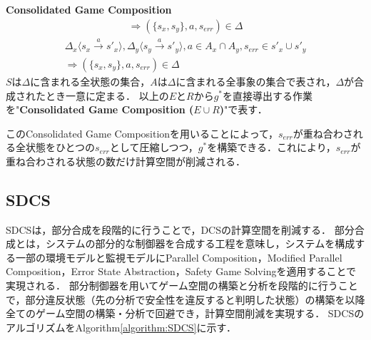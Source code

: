 \begin{dfn}{\textbf{Consolidated Game Composition}}
\begin{multline}
    \Rightarrow (\{ s_{x},s_{y} \},a,s_{err}) \in \Delta
    \end{multline}
    \begin{multline}
    \label{formula:pc6}
    \Delta_x \langle s_{x} \overset{a}{\rightarrow} s'_{x} \rangle, \Delta_y \langle s_{y} \overset{a}{\rightarrow} s'_{y} \rangle, a \in A_{x} \cap A_{y}, s_{err} \in s'_{x} \cup s'_{y}\\
    \Rightarrow (\{ s_{x},s_{y} \},a,s_{err}) \in \Delta
    \end{multline}
    $S$は$\Delta$に含まれる全状態の集合，$A$は$\Delta$に含まれる全事象の集合で表され，$\Delta$が合成されたとき一意に定まる．
    以上の$E$と$R$から$g^*$を直接導出する作業を"{\bf Consolidated Game Composition ($E \cup R$)}"で表す．
\end{dfn}

このConsolidated Game Compositionを用いることによって，$s_{err}$が重ね合わされる全状態をひとつの$s_{err}$として圧縮しつつ，$g^*$を構築できる．これにより，$s_{err}$が重ね合わされる状態の数だけ計算空間が削減される．



\subsection{SDCS}
\label{subsection:SDCS}
SDCS\cite{yamauchi:IEICEJ2023}は，部分合成を段階的に行うことで，DCSの計算空間を削減する．
部分合成とは，システムの部分的な制御器を合成する工程を意味し，システムを構成する一部の環境モデルと監視モデルにParallel Composition，Modified Parallel Composition，Error State Abstraction，Safety Game Solvingを適用することで実現される．
部分制御器を用いてゲーム空間の構築と分析を段階的に行うことで，部分違反状態（先の分析で安全性を違反すると判明した状態）の構築を以降全てのゲーム空間の構築・分析で回避でき，計算空間削減を実現する．
SDCSのアルゴリズムをAlgorithm\ref{algorithm:SDCS}に示す．

